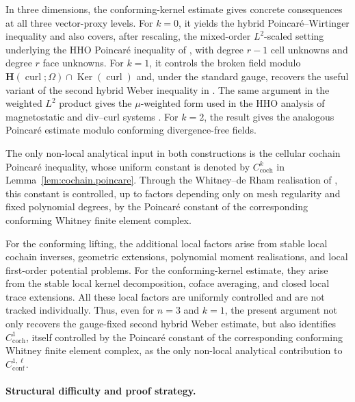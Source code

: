 \documentclass[a4paper,11pt]{article}
\theoremstyle{definition}
\newcommand{\Ker}{\operatorname{Ker}}
\begin{document}
In three dimensions, the conforming-kernel estimate gives concrete consequences at all three vector-proxy levels.
For $k=0$, it yields the hybrid Poincar\'e--Wirtinger inequality and also covers, after rescaling, the mixed-order $L^2$-scaled setting underlying the HHO Poincar\'e inequality of \cite[Lemma~12]{Di-Pietro.Droniou:25b}, with degree $r-1$ cell unknowns and degree $r$ face unknowns.
For $k=1$, it controls the broken field modulo $\boldsymbol H(\operatorname{curl};\Omega)\cap\Ker(\operatorname{curl})$ and, under the standard gauge, recovers the useful variant of the second hybrid Weber inequality in \cite[Remark~16]{Lemaire.Pitassi:25}.
The same argument in the weighted $L^2$ product gives the $\mu$-weighted form used in the HHO analysis of magnetostatic and div--curl systems \cite{Dalphin.Ducreux.Lemaire.Pitassi:25}.
For $k=2$, the result gives the analogous Poincar\'e estimate modulo conforming divergence-free fields.

The only non-local analytical input in both constructions is the cellular cochain Poincar\'e inequality, whose uniform constant is denoted by $C_{\mathrm{coch}}^k$ in Lemma~\ref{lem:cochain.poincare}.
Through the Whitney--de Rham realisation of \cite[Lemma~6 and Section~3.4]{Di-Pietro.Droniou.ea:25}, this constant is controlled, up to factors depending only on mesh regularity and fixed polynomial degrees, by the Poincar\'e constant of the corresponding conforming Whitney finite element complex.

For the conforming lifting, the additional local factors arise from stable local cochain inverses, geometric extensions, polynomial moment realisations, and local first-order potential problems.
For the conforming-kernel estimate, they arise from the stable local kernel decomposition, coface averaging, and closed local trace extensions.
All these local factors are uniformly controlled and are not tracked individually.
Thus, even for $n=3$ and $k=1$, the present argument not only recovers the gauge-fixed second hybrid Weber estimate, but also identifies $C_{\mathrm{coch}}^1$, itself controlled by the Poincar\'e constant of the corresponding conforming Whitney finite element complex, as the only non-local analytical contribution to $C_{\mathrm{conf}}^{1,\ell}$.

\paragraph*{Structural difficulty and proof strategy.}
\end{document}
